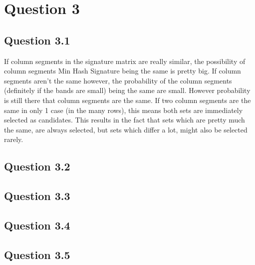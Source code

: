 \documentclass[11pt,twoside,a4paper]{article}
\begin{document}
 \section{Question 3}
 
 	\subsection{Question 3.1}
 	If column segments in the signature matrix are really similar, the possibility of column segments Min Hash Signature being the same is pretty big. If column segments aren't the same however, the probability of the column segments (definitely if the bands are small) being the same are small. However probability is still there that column segments are the same. If two column segments are the same in only 1 case (in the many rows), this means both sets are immediately selected as candidates. This results in the fact that sets which are pretty much the same, are always selected, but sets which differ a lot, might also be selected rarely.
 	
 	\subsection{Question 3.2}
 	
 	
 	\subsection{Question 3.3}
 	
 	\subsection{Question 3.4}
 	
 	\subsection{Question 3.5}
		
	
\begin{thebibliography}{9}
\end{thebibliography}
\end{document}
